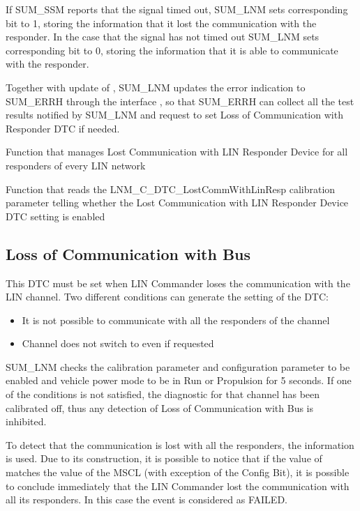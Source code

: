 If SUM_SSM reports that the signal timed out, SUM_LNM sets  corresponding bit to 1, storing the information that it lost the communication with the responder. In the case that the 
signal has not timed out SUM_LNM sets  corresponding bit to 0, storing the information that it is able to communicate with the responder.

{
Together with update of , SUM_LNM updates the error indication to SUM_ERRH through the interface , so that SUM_ERRH can collect all the test results notified by 
SUM_LNM and request to set Loss of Communication with Responder DTC if needed.
}
{}

{}
{}
{}
{}
{Function that manages Lost Communication with LIN Responder Device for all responders of every LIN network}

{}
{}
{}
{}
{Function that reads the LNM_C_DTC_LostCommWithLinResp calibration parameter telling whether the Lost Communication with LIN Responder Device DTC setting is enabled}

\subsection{Loss of Communication with Bus}
\label{subsec:LossCommBus}
This DTC must be set when LIN Commander loses the communication with the LIN channel. Two different conditions can generate the setting of the DTC:
\begin{itemize}
    \item It is not possible to communicate with all the responders of the channel
	\item Channel does not switch to  even if requested
\end{itemize}

{
SUM_LNM checks the  calibration parameter and  configuration parameter to be enabled and vehicle power mode to be in Run or Propulsion for 5 seconds. If one of the conditions is not satisfied, the diagnostic for that channel has been calibrated off, thus any detection of Loss of Communication with Bus is inhibited.
}
{}

{
To detect that the communication is lost with all the responders, the  information is used. Due to its construction, it is possible to notice that if the value of  matches
the value of the MSCL (with exception of the Config Bit), it is possible to conclude immediately that the LIN Commander lost the communication with all its responders. In this case the event is considered as FAILED.
}
{}

